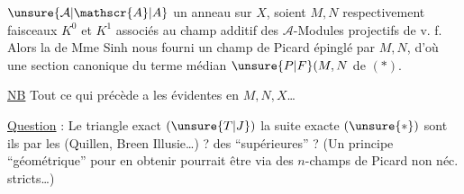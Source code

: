 
\uline{}\unsure{:|,}  $\unsure{\mathcal{A}|\mathscr{A}|A}$ un anneau sur $X$, soient $M,N$ respectivement  faisceaux $K^{0}$ et $K^{1}$ associés au champ additif des $\mathcal{A}$-Modules projectifs de v. f.  Alors la  de Mme Sinh nous fourni un champ de Picard épinglé par $M,N$, d'où une section  canonique du terme médian $\unsure{P|F}(M,N$ de $(*)$.

\uline{NB} Tout ce qui précède a les  évidentes en $M,N,X$\ldots

\uline{Question} : Le triangle exact $(\unsure{T|J})$  la suite exacte $(\unsure{*})$ sont ils  par les  (Quillen, Breen Illusie\ldots) ?  des  ``supérieures'' ? (Un principe ``géométrique'' pour en obtenir pourrait être via des $n$-champs de Picard non néc. stricts\ldots)

